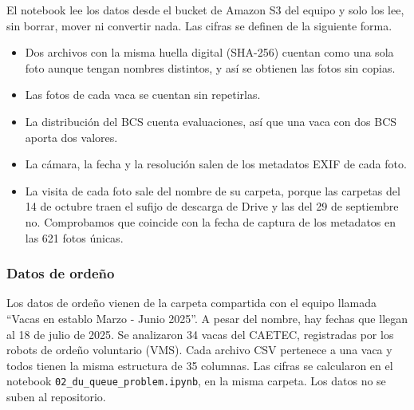 El notebook lee los datos desde el bucket de Amazon S3 del equipo y solo los lee, sin borrar, mover ni convertir nada. Las cifras se definen de la siguiente forma.

\begin{itemize}
  \item Dos archivos con la misma huella digital (SHA-256) cuentan como una sola foto aunque tengan nombres distintos, y así se obtienen las fotos sin copias.
  \item Las fotos de cada vaca se cuentan sin repetirlas.
  \item La distribución del BCS cuenta evaluaciones, así que una vaca con dos BCS aporta dos valores.
  \item La cámara, la fecha y la resolución salen de los metadatos EXIF de cada foto.
  \item La visita de cada foto sale del nombre de su carpeta, porque las carpetas del 14 de octubre traen el sufijo de descarga de Drive y las del 29 de septiembre no. Comprobamos que coincide con la fecha de captura de los metadatos en las 621 fotos únicas.
\end{itemize}

\subsubsection*{Datos de ordeño}

Los datos de ordeño vienen de la carpeta compartida con el equipo llamada ``Vacas en establo Marzo - Junio 2025''. A pesar del nombre, hay fechas que llegan al 18 de julio de 2025. Se analizaron 34 vacas del CAETEC, registradas por los robots de ordeño voluntario (VMS). Cada archivo CSV pertenece a una vaca y todos tienen la misma estructura de 35 columnas. Las cifras se calcularon en el notebook \nolinkurl{02_du_queue_problem.ipynb}, en la misma carpeta. Los datos no se suben al repositorio.
